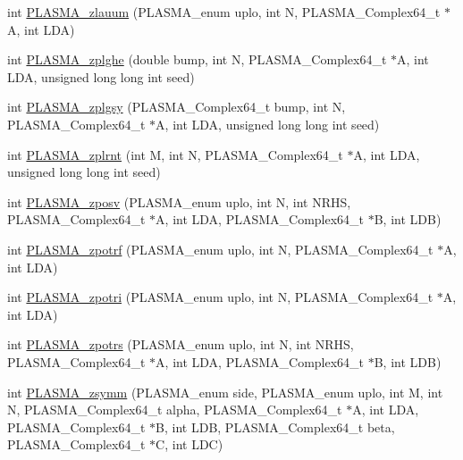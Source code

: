 \begin{DoxyCompactItemize}
\item 
int \hyperlink{group__PLASMA__Complex64__t_ga0e1f064db19e3855c590172274fbdf43_ga0e1f064db19e3855c590172274fbdf43}{PLASMA\_\-zlauum} (PLASMA\_\-enum uplo, int N, PLASMA\_\-Complex64\_\-t $\ast$A, int LDA)
\item 
int \hyperlink{group__PLASMA__Complex64__t_ga3a50559a69450b4f13a23c4af092c60e_ga3a50559a69450b4f13a23c4af092c60e}{PLASMA\_\-zplghe} (double bump, int N, PLASMA\_\-Complex64\_\-t $\ast$A, int LDA, unsigned long long int seed)
\item 
int \hyperlink{group__PLASMA__Complex64__t_ga065c2bc2190fc079035e1de4d16e4e60_ga065c2bc2190fc079035e1de4d16e4e60}{PLASMA\_\-zplgsy} (PLASMA\_\-Complex64\_\-t bump, int N, PLASMA\_\-Complex64\_\-t $\ast$A, int LDA, unsigned long long int seed)
\item 
int \hyperlink{group__PLASMA__Complex64__t_gaed78cffc7c2835c485ef7c8e3761d127_gaed78cffc7c2835c485ef7c8e3761d127}{PLASMA\_\-zplrnt} (int M, int N, PLASMA\_\-Complex64\_\-t $\ast$A, int LDA, unsigned long long int seed)
\item 
int \hyperlink{group__PLASMA__Complex64__t_gaed71622155778ea4372e34879184e742_gaed71622155778ea4372e34879184e742}{PLASMA\_\-zposv} (PLASMA\_\-enum uplo, int N, int NRHS, PLASMA\_\-Complex64\_\-t $\ast$A, int LDA, PLASMA\_\-Complex64\_\-t $\ast$B, int LDB)
\item 
int \hyperlink{group__PLASMA__Complex64__t_ga850a6c9da7c5632d160b28f211cdf2eb_ga850a6c9da7c5632d160b28f211cdf2eb}{PLASMA\_\-zpotrf} (PLASMA\_\-enum uplo, int N, PLASMA\_\-Complex64\_\-t $\ast$A, int LDA)
\item 
int \hyperlink{group__PLASMA__Complex64__t_ga6dd563144dd8c7f29a58659f220f44a0_ga6dd563144dd8c7f29a58659f220f44a0}{PLASMA\_\-zpotri} (PLASMA\_\-enum uplo, int N, PLASMA\_\-Complex64\_\-t $\ast$A, int LDA)
\item 
int \hyperlink{group__PLASMA__Complex64__t_gafa3392d835a508f57674c601c46eb331_gafa3392d835a508f57674c601c46eb331}{PLASMA\_\-zpotrs} (PLASMA\_\-enum uplo, int N, int NRHS, PLASMA\_\-Complex64\_\-t $\ast$A, int LDA, PLASMA\_\-Complex64\_\-t $\ast$B, int LDB)
\item 
int \hyperlink{group__PLASMA__Complex64__t_ga78d0974b51b7d019e0606422b3292b46_ga78d0974b51b7d019e0606422b3292b46}{PLASMA\_\-zsymm} (PLASMA\_\-enum side, PLASMA\_\-enum uplo, int M, int N, PLASMA\_\-Complex64\_\-t alpha, PLASMA\_\-Complex64\_\-t $\ast$A, int LDA, PLASMA\_\-Complex64\_\-t $\ast$B, int LDB, PLASMA\_\-Complex64\_\-t beta, PLASMA\_\-Complex64\_\-t $\ast$C, int LDC)

\end{DoxyCompactItemize}
